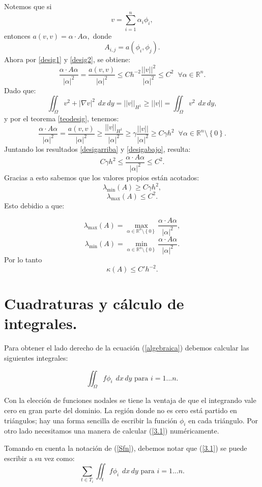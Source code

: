 \documentclass[12pt,spanish,oneside]{book}
\theoremstyle{plain}
\numberwithin{equation}{chapter}
\theoremstyle{definition}
\theoremstyle{remark}
\newcommand{\re}{\mathbb{R}}
\newcommand{\hu}{H^1}
\newcommand{\dxy}{\hspace{5pt} dx\hspace{2pt} dy }
\newcommand{\intomega}[1]{\iint_\Omega #1 \dxy} %
\newcommand{\llaves}[1]{\left\lbrace #1\right\rbrace}
\begin{document}
Notemos que si \[v=\sum_{i=1}^{n}\alpha_i \phi_i,\] entonces $a(v,v)=\alpha\cdot A \alpha,$ donde \[A_{i,j}=a(\phi_i, \phi_j).\]
Ahora por \ref{desig1} y \ref{desig2}, se obtiene:
\begin{equation}\label{desigarriba}
\frac{\alpha\cdot A \alpha}{|\alpha|^{2}}=\frac{a(v,v)}{|\alpha|^{2}}\leq Ch^{-2}\frac{||v||^2}{|\alpha|^{2}}\leq C^2 \phantom{\pi} \forall \alpha \in \re^n.
\end{equation}
Dado que:\[\intomega{v^2+|\nabla v|^2}=||v||_{\hu}\geq||v||= \intomega{v^2},\]
y por el teorema \ref{teodesig}, tenemos:
\begin{equation}\label{desigabajo}
\frac{\alpha\cdot A \alpha}{|\alpha|^{2}}=\frac{a(v,v)}{|\alpha|^{2}}\geq\frac{||v||_{\hu}}{|\alpha|^{2}}\geq\gamma\frac{||v||}{|\alpha|^{2}}\geq C\gamma h^2 \phantom{\pi} \forall \alpha \in \re^n\setminus \llaves{0}.
\end{equation}
Juntando los resultados \ref{desigarriba} y \ref{desigabajo}, resulta: 
\[ C\gamma h^2\leq\frac{\alpha\cdot A \alpha}{|\alpha|^{2}}\leq C^2. \]
Gracias a esto sabemos que los valores propios están acotados: \[\lambda_{\min}(A)\geq C\gamma h^2,\]\[\lambda_{\max}(A)\leq C^2.\]
Esto debidio a que:

\[\lambda_{\max}(A)= \max_{\alpha\in \re^n\setminus \llaves{0}}\frac{\alpha\cdot A\alpha}{ |\alpha|^2}, \]
\[\lambda_{\min}(A)= \min_{\alpha\in \re^n\setminus \llaves{0}}\frac{\alpha\cdot A\alpha}{ |\alpha|^2}. \]
Por lo tanto \[\kappa(A)\leq C' h^{-2}.\]



\section{Cuadraturas y cálculo de integrales.}

Para obtener el lado derecho de la ecuación (\ref{algebraica}) debemos calcular las siguientes integrales:

\begin{equation}
\iint_\Omega f \phi_i \dxy \text{ para } i=1...n. \label{3.1}
\end{equation}

Con la elección de funciones nodales se tiene la ventaja de que el integrando vale cero en gran parte del dominio. La región donde no es cero está partido en triángulos; hay una forma sencilla de escribir la función $\phi_i$ en cada triángulo. Por otro lado  necesitamos una manera de calcular (\ref{3.1}) numéricamente. 

Tomando en cuenta la notación de (\ref{Sfn}), debemos notar que (\ref{3.1}) se puede escribir a su vez como:
\begin{equation}
\sum_{t\in T_i }\iint_t f \phi_i \dxy \text{ para } i=1...n. \label{3.2}
\end{equation}
\end{document}
